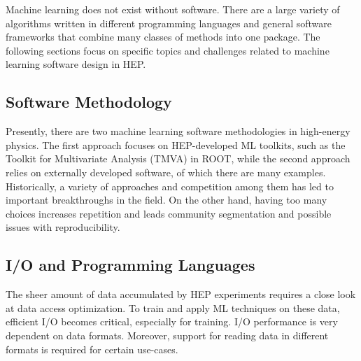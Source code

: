 
Machine learning does not exist without software. There are a large variety of algorithms written in different programming languages and general software frameworks that combine many classes of methods into one package. The following sections focus on specific topics and challenges related to machine learning software design in HEP.



\subsection{Software Methodology}
Presently, there are two machine learning software methodologies in high-energy physics. The first approach focuses on HEP-developed ML toolkits, such as the Toolkit for Multivariate Analysis (TMVA) in ROOT, while the second approach relies on externally developed software, of which there are many examples. Historically, a variety of approaches and competition among them has led to important breakthroughs in the field. On the other hand, having too many choices increases repetition and leads community segmentation and possible issues with reproducibility.


\subsection{I/O and Programming Languages}\label{sec:software_IO}
The sheer amount of data accumulated by HEP experiments requires a close look at data access optimization. To train and apply ML techniques on these data, efficient I/O becomes critical, especially for training. I/O performance is very dependent on data formats. Moreover, support for reading data in different formats is required for certain use-cases.

